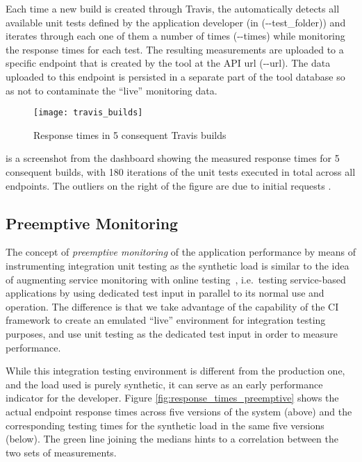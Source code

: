   Each time a new build is created through Travis, the \tool automatically detects all available unit tests defined by the application developer (in (-{}-test\_folder)) and iterates through each one of them a number of times (-{}-times) while monitoring the response times for each test. The resulting measurements are uploaded to a specific endpoint that is created by the tool at the API url (-{}-url). The data uploaded to this endpoint is   persisted in a separate part of the tool database so as not to contaminate the ``live'' monitoring data. 

      \begin{figure}[h!]
        \centering
        \texttt{[image: travis\_builds]}
        \caption{Response times in 5 consequent Travis builds}
        \label{fig:builds}
      \end{figure}

   is a screenshot from the dashboard showing the measured response times for 5 consequent builds, with 180 iterations of the unit tests executed in total across all endpoints. The outliers on the right of the figure are due to initial requests .  
  


  \subsection*{Preemptive Monitoring}
  The concept of {\em preemptive monitoring} of the application performance by means of instrumenting integration unit testing as the synthetic load is similar to the idea of augmenting service monitoring with online testing~\cite{metzger2010proactive}, i.e.~testing service-based applications by using dedicated test input in parallel to its normal use and operation. The difference is that we take advantage of the capability of the CI framework to create an emulated ``live'' environment for integration testing purposes, and use unit testing as the dedicated test input in order to measure performance. 
  
  While this integration testing environment is different from the production one, and the load used is purely synthetic, it can serve as an early performance indicator for the developer.  Figure \ref{fig:response_times_preemptive} shows the actual endpoint response times across five versions of the system (above) and the corresponding testing times for the synthetic load in the same five versions (below). The green line joining the medians hints to a correlation between the two sets of measurements. 

